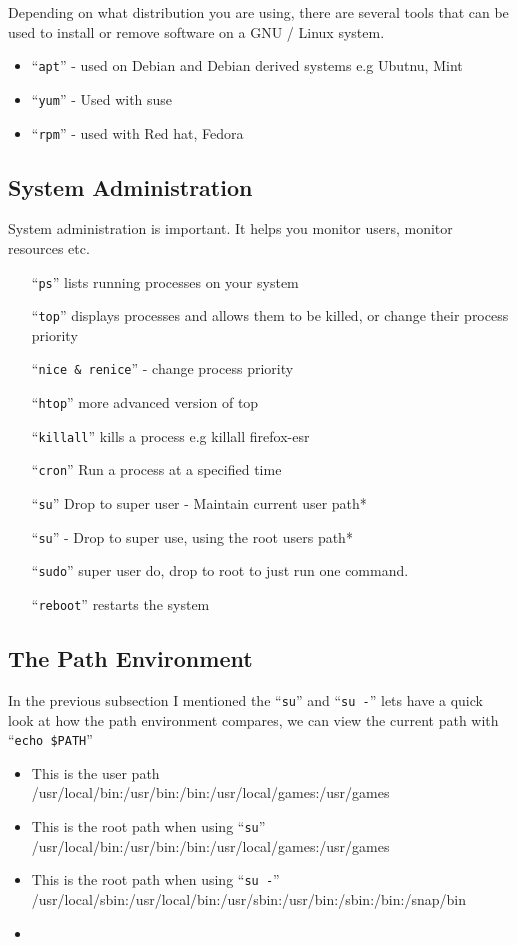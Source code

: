 \documentclass{extbook}
\begin{document}
Depending on what distribution you are using, there are several tools that can be used to install or remove software on a GNU / Linux system.  

\begin{itemize}
\item ``\verb|apt|'' - used on Debian and Debian derived systems e.g Ubutnu, Mint
\item ``\verb|yum|'' - Used with suse 
\item ``\verb|rpm|'' - used with Red hat, Fedora 
\end{itemize}

\subsection{System Administration}

System administration is important.  It helps you monitor users, monitor resources etc.
\begin{itemize}
\item[``\texttt{ps}''] lists running processes on your system
\item[``\texttt{top}''] displays processes and allows them to be killed, or change their process priority
\item[``\texttt{nice \& renice}''] - change process priority
\item[``\texttt{htop}''] more advanced version of top
\item[``\texttt{killall}''] kills a process e.g killall firefox-esr
\item[``\texttt{cron}''] Run a process at a specified time
\item[``\texttt{su}''] Drop to super user - Maintain current user path*
\item[``\texttt{su}''] - Drop to super use,  using the root users path* 
\item[``\texttt{sudo}''] super user do,  drop to root to just run one command.
\item[``\texttt{reboot}''] restarts the system
\end{itemize}


\subsection{The Path Environment}
 In the previous subsection I mentioned the ``\verb|su|'' and ``\verb|su -|'' lets have a quick look at how the path environment compares,  we can view the current path with ``\verb|echo $PATH|''
\begin{itemize}
\item This is the user path /usr/local/bin:/usr/bin:/bin:/usr/local/games:/usr/games
\item This is the root path when using ``\verb|su|'' /usr/local/bin:/usr/bin:/bin:/usr/local/games:/usr/games
\item This is the root path when using ``\verb|su -|'' /usr/local/sbin:/usr/local/bin:/usr/sbin:/usr/bin:/sbin:/bin:/snap/bin
\item 
\end{itemize}
\end{document}
